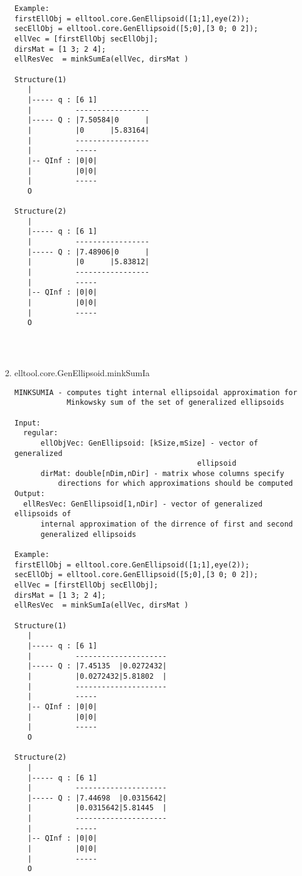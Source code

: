 \begin{enumerate}
\begin{lstlisting}
Example:
firstEllObj = elltool.core.GenEllipsoid([1;1],eye(2));
secEllObj = elltool.core.GenEllipsoid([5;0],[3 0; 0 2]);
ellVec = [firstEllObj secEllObj];
dirsMat = [1 3; 2 4];
ellResVec  = minkSumEa(ellVec, dirsMat )

Structure(1)
   |
   |----- q : [6 1]
   |          -----------------
   |----- Q : |7.50584|0      |
   |          |0      |5.83164|
   |          -----------------
   |          -----
   |-- QInf : |0|0|
   |          |0|0|
   |          -----
   O

Structure(2)
   |
   |----- q : [6 1]
   |          -----------------
   |----- Q : |7.48906|0      |
   |          |0      |5.83812|
   |          -----------------
   |          -----
   |-- QInf : |0|0|
   |          |0|0|
   |          -----
   O




\end{lstlisting}
\fontfamily{\familydefault}
\selectfont
\item {elltool.core.GenEllipsoid.minkSumIa}
\selectfont
\begin{lstlisting}
MINKSUMIA - computes tight internal ellipsoidal approximation for
            Minkowsky sum of the set of generalized ellipsoids

Input:
  regular:
      ellObjVec: GenEllipsoid: [kSize,mSize] - vector of  generalized
                                          ellipsoid
      dirMat: double[nDim,nDir] - matrix whose columns specify
          directions for which approximations should be computed
Output:
  ellResVec: GenEllipsoid[1,nDir] - vector of generalized ellipsoids of
      internal approximation of the dirrence of first and second
      generalized ellipsoids

Example:
firstEllObj = elltool.core.GenEllipsoid([1;1],eye(2));
secEllObj = elltool.core.GenEllipsoid([5;0],[3 0; 0 2]);
ellVec = [firstEllObj secEllObj];
dirsMat = [1 3; 2 4];
ellResVec  = minkSumIa(ellVec, dirsMat )

Structure(1)
   |
   |----- q : [6 1]
   |          ---------------------
   |----- Q : |7.45135  |0.0272432|
   |          |0.0272432|5.81802  |
   |          ---------------------
   |          -----
   |-- QInf : |0|0|
   |          |0|0|
   |          -----
   O

Structure(2)
   |
   |----- q : [6 1]
   |          ---------------------
   |----- Q : |7.44698  |0.0315642|
   |          |0.0315642|5.81445  |
   |          ---------------------
   |          -----
   |-- QInf : |0|0|
   |          |0|0|
   |          -----
   O





\end{lstlisting}
\end{enumerate}
